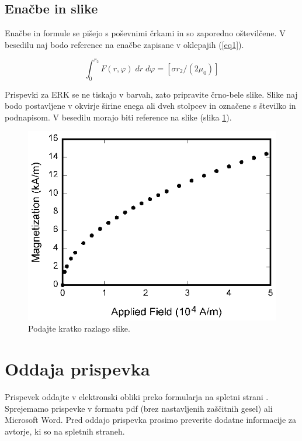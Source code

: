 \documentclass[a4paper]{article}
\begin{document}
\subsection{Enačbe in slike}

Enačbe in formule se pišejo s poševnimi črkami in so zaporedno oštevilčene. V besedilu naj bodo reference na enačbe zapisane v oklepajih (\ref{eq1}).

\begin{equation}
 \int^{r_{2}}_{0}F(r,\varphi)\; dr\; d\varphi= [\sigma r_{2} / (2\mu_{0})]
    \label{eq1}
\end{equation}

Prispevki za ERK se ne tiskajo v barvah, zato pripravite črno-bele slike. Slike naj bodo postavljene v okvirje širine enega ali dveh stolpcev in označene s številko in podnapisom. V besedilu morajo biti reference na slike (slika \ref{slika}).

\begin{figure}[!htb]
    \begin{center}
        \includegraphics[scale=1]{field1.eps}
        \caption{Podajte kratko razlago slike.} \label{slika}
    \end{center}
\end{figure}

\section{Oddaja prispevka}

Prispevek oddajte v elektronski obliki preko formularja na spletni strani \cite{ERK}. Sprejemamo prispevke v formatu pdf (brez nastavljenih zaščitnih gesel) ali Microsoft Word. Pred oddajo prispevka prosimo preverite dodatne informacije za avtorje, ki so na spletnih straneh. 
\end{document}
